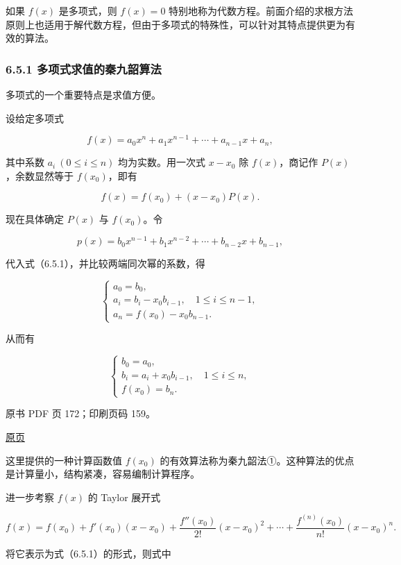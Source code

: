 如果 \(f(x)\) 是多项式，则 \(f(x)=0\) 特别地称为代数方程。前面介绍的求根方法原则上也适用于解代数方程，但由于多项式的特殊性，可以针对其特点提供更为有效的算法。

\subsubsection{6.5.1 多项式求值的秦九韶算法}\label{ch06-ux591aux9879ux5f0fux6c42ux503cux7684ux79e6ux4e5dux97f6ux7b97ux6cd5}

多项式的一个重要特点是求值方便。

设给定多项式

\[
f(x)=a_0x^n+a_1x^{n-1}+\cdots+a_{n-1}x+a_n,
\]

其中系数 \(a_i\ (0\leqslant i\leqslant n)\) 均为实数。用一次式 \(x-x_0\) 除 \(f(x)\)，商记作 \(P(x)\)，余数显然等于 \(f(x_0)\)，即有

\[
f(x)=f(x_0)+(x-x_0)P(x).
\tag{6.5.1}
\]

现在具体确定 \(P(x)\) 与 \(f(x_0)\)。令

\[
p(x)=b_0x^{n-1}+b_1x^{n-2}+\cdots+b_{n-2}x+b_{n-1},
\]

代入式（6.5.1），并比较两端同次幂的系数，得

\[
\begin{cases}
a_0=b_0,\\
a_i=b_i-x_0b_{i-1},\quad1\leqslant i\leqslant n-1,\\
a_n=f(x_0)-x_0b_{n-1}.
\end{cases}
\]

从而有

\[
\begin{cases}
b_0=a_0,\\
b_i=a_i+x_0b_{i-1},\quad1\leqslant i\leqslant n,\\
f(x_0)=b_n.
\end{cases}
\tag{6.5.2}
\]

\clearpage

原书 PDF 页 172；印刷页码 159。

\href{source-images/pdf-172.jpeg}{原页}

这里提供的一种计算函数值 \(f(x_0)\) 的有效算法称为秦九韶法①。这种算法的优点是计算量小，结构紧凑，容易编制计算程序。

进一步考察 \(f(x)\) 的 Taylor 展开式

\[
f(x)=f(x_0)+f'(x_0)(x-x_0)+\frac{f''(x_0)}{2!}(x-x_0)^2+\cdots+\frac{f^{(n)}(x_0)}{n!}(x-x_0)^n.
\]

将它表示为式（6.5.1）的形式，则式中

